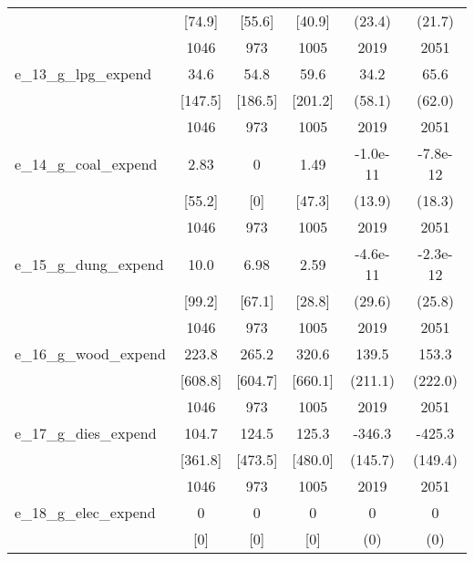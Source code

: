 \begin{table}[htbp]
\begin{tabular*}{0.9\hsize}{@{\hskip\tabcolsep\extracolsep\fill}l*{1}{ccccc}}
                                &   [74.9]&   [55.6]&   [40.9]&   (23.4)         &   (21.7)         \\
                                &     1046&      973&     1005&     2019         &     2051         \\
e\_13\_g\_lpg\_expend               &     34.6&     54.8&     59.6&     34.2         &     65.6         \\
                                &  [147.5]&  [186.5]&  [201.2]&   (58.1)         &   (62.0)         \\
                                &     1046&      973&     1005&     2019         &     2051         \\
e\_14\_g\_coal\_expend              &     2.83&        0&     1.49& -1.0e-11         & -7.8e-12         \\
                                &   [55.2]&      [0]&   [47.3]&   (13.9)         &   (18.3)         \\
                                &     1046&      973&     1005&     2019         &     2051         \\
e\_15\_g\_dung\_expend              &     10.0&     6.98&     2.59& -4.6e-11         & -2.3e-12         \\
                                &   [99.2]&   [67.1]&   [28.8]&   (29.6)         &   (25.8)         \\
                                &     1046&      973&     1005&     2019         &     2051         \\
e\_16\_g\_wood\_expend              &    223.8&    265.2&    320.6&    139.5         &    153.3         \\
                                &  [608.8]&  [604.7]&  [660.1]&  (211.1)         &  (222.0)         \\
                                &     1046&      973&     1005&     2019         &     2051         \\
e\_17\_g\_dies\_expend              &    104.7&    124.5&    125.3&   -346.3\sym{**} &   -425.3\sym{***}\\
                                &  [361.8]&  [473.5]&  [480.0]&  (145.7)         &  (149.4)         \\
                                &     1046&      973&     1005&     2019         &     2051         \\
e\_18\_g\_elec\_expend              &        0&        0&        0&        0         &        0         \\
                                &      [0]&      [0]&      [0]&      (0)         &      (0)         \\

\end{tabular*}
\end{table}
